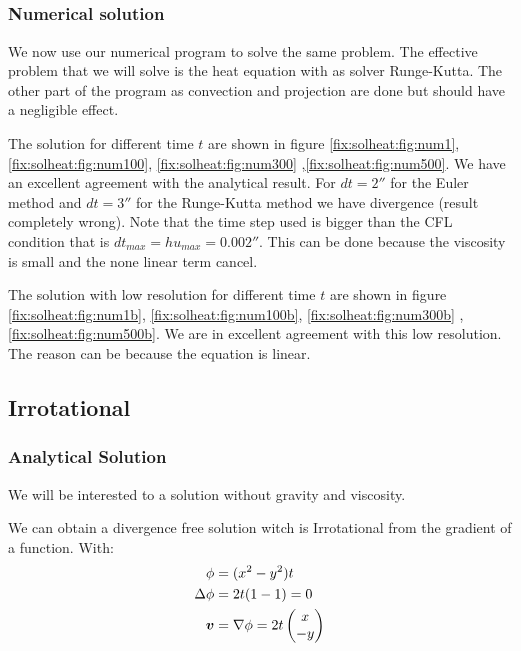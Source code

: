 \subsection{}

\subsubsection{Numerical solution}

We now use our numerical program to solve the same problem. The effective problem that we will solve is the heat equation with as solver Runge-Kutta.
The other part of the program as convection and projection are done but should have a negligible effect.

The solution for different time $t$ are shown in figure \ref{fix:solheat:fig:num1}, \ref{fix:solheat:fig:num100}, \ref{fix:solheat:fig:num300} ,\ref{fix:solheat:fig:num500}. We have an excellent agreement with the analytical result.
For $dt=2\second$ for the Euler method and $dt=\unit{3}{\second}$ for the Runge-Kutta method we have divergence (result completely wrong).
Note that the time step used is bigger than the CFL condition that is $dt_{max}=hu_{max}=\unit{0.002}{\second}$. This can be done because the viscosity is small and the none linear term cancel.

The solution with low resolution for different time $t$ are shown in figure \ref{fix:solheat:fig:num1b}, \ref{fix:solheat:fig:num100b}, \ref{fix:solheat:fig:num300b} ,\ref{fix:solheat:fig:num500b}.
We are in excellent agreement with this low resolution. The reason can be because the equation is linear. 



\subsection{Irrotational}

\subsubsection{Analytical Solution}

We will be interested to a solution without gravity and viscosity.


We can obtain a divergence free solution witch is Irrotational from the gradient of a function.
With:
\begin{align}
	\phi&=(x^2-y^2)t\\
	\Delta \phi &=2t(1-1)=0\\
	{\boldsymbol {v}}&=\nabla \phi=2t\begin{pmatrix}
	               	x\\
	               	-y
	               \end{pmatrix}
\end{align}

